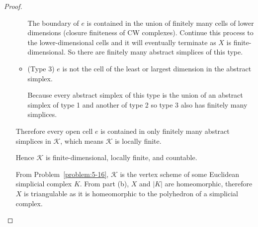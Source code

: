\begin{proof}
\begin{enumerate}[label={(\alph*)}]
\begin{itemize}[leftmargin=*]
			            The boundary of \( e \) is contained in the union of finitely many cells of lower dimensions (closure finiteness of CW complexes). Continue this process to the lower-dimensional cells and it will eventually terminate as \( X \) is finite-dimensional. So there are finitely many abstract simplices of this type.
			      \item (Type 3) \( e \) is not the cell of the least or largest dimension in the abstract simplex.

			            Because every abstract simplex of this type is the union of an abstract simplex of type 1 and another of type 2 so type 3 also has finitely many simplices.
		      \end{itemize}

		      Therefore every open cell \( e \) is contained in only finitely many abstract simplices in \( \mathcal{K} \), which means \( \mathcal{K} \) is locally finite.

		      Hence \( \mathcal{K} \) is finite-dimensional, locally finite, and countable.

		      From Problem~\ref{problem:5-16}, \( \mathcal{K} \) is the vertex scheme of some Euclidean simplicial complex \( K \). From part (b), \( X \) and \( \left\vert K \right\vert \) are homeomorphic, therefore \( X \) is triangulable as it is homeomorphic to the polyhedron of a simplicial complex.
	\end{enumerate}
\end{proof}
